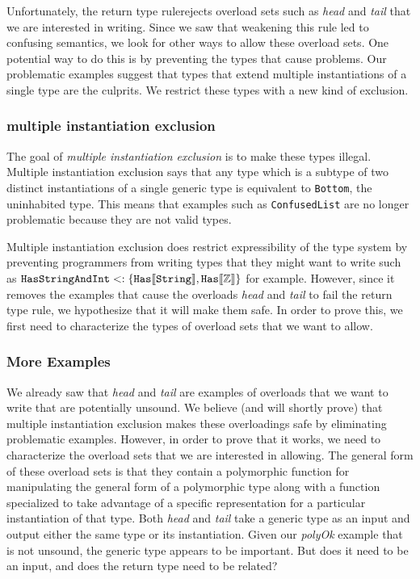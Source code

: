 \documentclass[preprint]{sigplanconf}
\newcommand{\ob}[1]{\ensuremath{\llbracket {#1} \rrbracket}}
\begin{document}
Unfortunately, the return type rulerejects overload sets such as {\it head} and 
{\it tail} that we are interested in writing.  Since we saw that weakening this rule led
to confusing semantics, we look for other ways to allow these overload sets.  One potential
way to do this is by preventing the types that cause problems.  Our problematic examples
suggest that types that extend multiple instantiations of a single type are the culprits.
We restrict these types with a new kind of exclusion.

\subsubsection{multiple instantiation exclusion}

The goal of {\it multiple instantiation exclusion} is to make these types illegal.  Multiple instantiation exclusion 
says that any type which is a subtype of two distinct instantiations of a single generic type is equivalent to 
{\tt Bottom}, the uninhabited type.  This means that examples such as {\tt ConfusedList} are no longer problematic 
because they are not valid types.  

Multiple instantiation exclusion does restrict expressibility of the type system by preventing programmers
from writing types that they might want to write such as 
${\tt HasStringAndInt} <: \{ {\tt Has}\ob{{\tt String}}, {\tt Has}\ob{\mathbb{Z}} \}$ for example.  However, since it
removes the examples that cause the overloads {\it head} and {\it tail} to fail the return type rule, we hypothesize
that it will make them safe.  In order to prove this, we first need to characterize the types of overload sets
that we want to allow.

\subsubsection{More Examples}

We already saw that {\it head} and {\it tail} are examples of overloads that we want to write
that are potentially unsound.  We believe (and will shortly prove) that multiple instantiation
exclusion makes these overloadings safe by eliminating problematic examples.  However,
in order to prove that it works, we need to characterize the overload sets that we are interested
in allowing.  The general form of these overload sets is that they contain a
polymorphic function for manipulating the general form of a polymorphic type along with
a function specialized to take advantage of a specific representation for a particular 
instantiation of that type.  Both {\it head} and {\it tail} take a generic type as an input and output either
the same type or its instantiation.  Given our {\it polyOk} example that is not unsound, the generic type 
appears to be important.  But does it need to be an input, and does the return type need to be
related?
\end{document}
